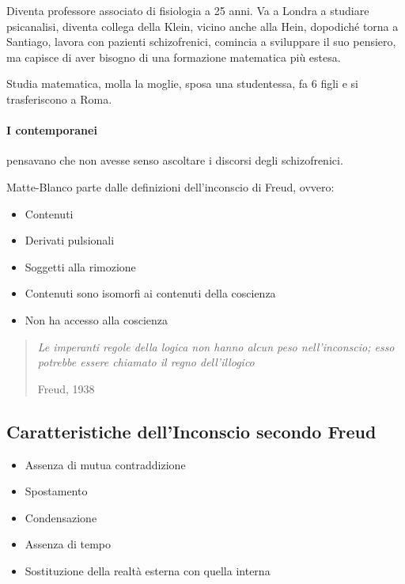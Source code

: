 \documentclass[12pt, a4paper]{article}
\begin{document}
Diventa professore associato di fisiologia a 25 anni. Va a Londra a studiare psicanalisi, diventa collega della Klein, vicino anche alla Hein, dopodiché torna a Santiago, lavora con pazienti schizofrenici, comincia a sviluppare il suo pensiero, ma capisce di aver bisogno di una formazione mate\-matica più estesa.

Studia matematica, molla la moglie, sposa una studentessa, fa 6 figli e si trasferiscono a Roma.

\paragraph{I contemporanei}  pensavano che non avesse senso ascoltare i discorsi degli schizofrenici.

Matte-Blanco parte dalle definizioni dell'inconscio di Freud, ovvero:
\begin{itemize}
    \item Contenuti
    \item Derivati pulsionali
    \item Soggetti alla rimozione
    \item Contenuti sono isomorfi ai contenuti della coscienza
    \item Non ha accesso alla coscienza
\end{itemize}

\begin{quote}
    \emph{Le imperanti regole della logica non hanno alcun peso nell'incon\-scio; esso potrebbe essere chiamato il regno dell'illogico}
    \begin{flushright}
        Freud, 1938
    \end{flushright}
\end{quote}

\subsection{Caratteristiche dell'Inconscio secondo Freud}

\begin{itemize}
    \item Assenza di mutua contraddizione
    \item Spostamento
    \item Condensazione
    \item Assenza di tempo
    \item Sostituzione della realtà esterna con quella interna
\end{itemize}
\end{document}
